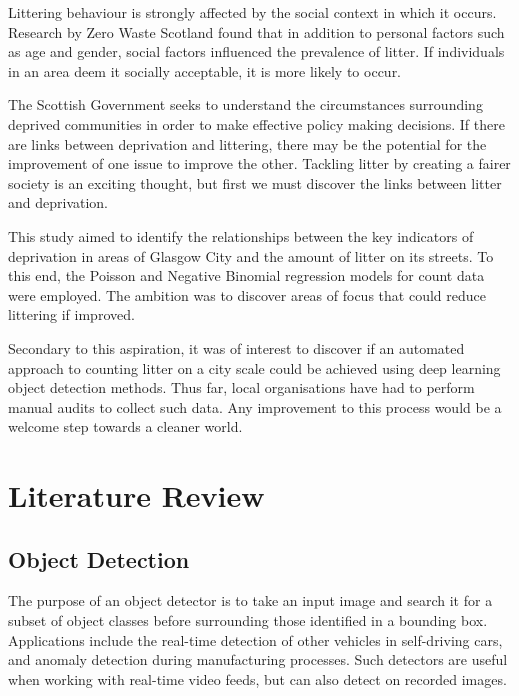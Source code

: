 \documentclass{thesis}
\begin{document}
Littering behaviour is strongly affected by the social context in which it occurs\cite{littering-behaviour}. Research by Zero Waste Scotland found that in addition to personal factors such as age and gender, social factors influenced the prevalence of litter. If individuals in an area deem it socially acceptable, it is more likely to occur. 

The Scottish Government seeks to understand the circumstances surrounding deprived communities in order to make effective policy making decisions. If there are links between deprivation and littering, there may be the potential for the improvement of one issue to improve the other. Tackling litter by creating a fairer society is an exciting thought, but first we must discover the links between litter and deprivation.

This study aimed to identify the relationships between the key indicators of deprivation in areas of Glasgow City and the amount of litter on its streets. To this end, the Poisson and Negative Binomial regression models for count data were employed. The ambition was to discover areas of focus that could reduce littering if improved.

Secondary to this aspiration, it was of interest to discover if an automated approach to counting litter on a city scale could be achieved using deep learning object detection methods. Thus far, local organisations have had to perform manual audits to collect such data. Any improvement to this process would be a welcome step towards a cleaner world.


\chapter{Literature Review}

\section{Object Detection}

The purpose of an object detector is to take an input image and search it for a subset of object classes before surrounding those identified in a bounding box. Applications include the real-time detection of other vehicles in self-driving cars, and anomaly detection during manufacturing processes. Such detectors are useful when working with real-time video feeds, but can also detect on recorded images. 
\end{document}
